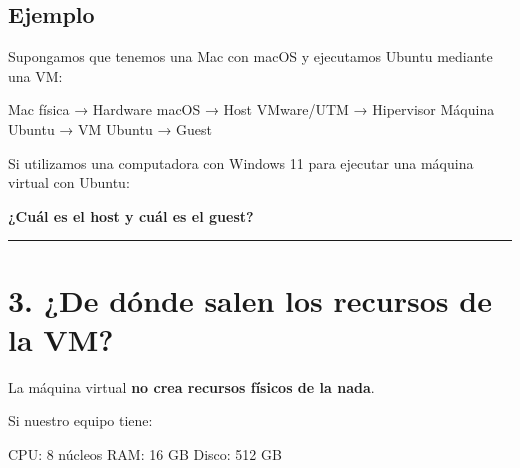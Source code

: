 \documentclass[
  spanish,
  letterpaper,
]{scrbook}
\newenvironment{Shaded}{\begin{snugshade}}{\end{snugshade}}
\newcommand{\NormalTok}[1]{\textcolor[rgb]{0.00,0.23,0.31}{#1}}
\begin{document}
\section{Ejemplo}\label{ejemplo-7}

Supongamos que tenemos una Mac con macOS y ejecutamos Ubuntu mediante
una VM:

\begin{Shaded}
\begin{Highlighting}[]
\NormalTok{Mac física       → Hardware}
\NormalTok{macOS            → Host}
\NormalTok{VMware/UTM       → Hipervisor}
\NormalTok{Máquina Ubuntu   → VM}
\NormalTok{Ubuntu           → Guest}
\end{Highlighting}
\end{Shaded}

\begin{tcolorbox}[enhanced jigsaw, arc=.35mm, bottomrule=.15mm, bottomtitle=1mm, breakable, colback=white, colbacktitle=quarto-callout-important-color!10!white, colframe=quarto-callout-important-color-frame, coltitle=black, left=2mm, leftrule=.75mm, opacityback=0, opacitybacktitle=0.6, rightrule=.15mm, title=\textcolor{quarto-callout-important-color}{\faExclamation}\hspace{0.5em}{Pregunta para el grupo}, titlerule=0mm, toprule=.15mm, toptitle=1mm]

Si utilizamos una computadora con Windows 11 para ejecutar una máquina
virtual con Ubuntu:

\textbf{¿Cuál es el host y cuál es el guest?}

\end{tcolorbox}

\begin{center}\rule{0.5\linewidth}{0.5pt}\end{center}


\chapter{3. ¿De dónde salen los recursos de la
VM?}\label{de-duxf3nde-salen-los-recursos-de-la-vm}

La máquina virtual \textbf{no crea recursos físicos de la nada}.

Si nuestro equipo tiene:

\begin{Shaded}
\begin{Highlighting}[]
\NormalTok{CPU:    8 núcleos}
\NormalTok{RAM:    16 GB}
\NormalTok{Disco:  512 GB}
\end{Highlighting}
\end{Shaded}
\end{document}
